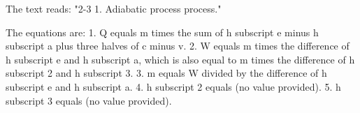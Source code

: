 The text reads: "2-3 1. Adiabatic process process."

The equations are:
1. Q equals m times the sum of h subscript e minus h subscript a plus three halves of c minus v.
2. W equals m times the difference of h subscript e and h subscript a, which is also equal to m times the difference of h subscript 2 and h subscript 3.
3. m equals W divided by the difference of h subscript e and h subscript a.
4. h subscript 2 equals (no value provided).
5. h subscript 3 equals (no value provided).